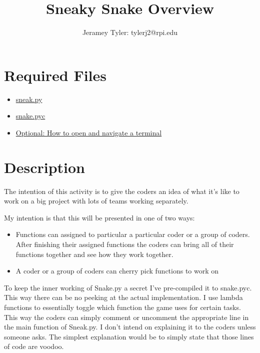 \documentclass{article}
\begin{document}
\title{Sneaky Snake Overview}
\author{Jeramey Tyler: tylerj2@rpi.edu}
\maketitle

\section{Required Files}

\begin{itemize}
\item{\href{https://raw.githubusercontent.com/JerameyATyler/coderDojo/master/sneak.py}{sneak.py}}
\item{\href{https://github.com/JerameyATyler/coderDojo/raw/master/__pycache__/snake.pyc}{snake.pyc}}
\item{\href{}{Optional: How to open and navigate a terminal}}
\end{itemize}

\section{Description}
The intention of this activity is to give the coders an idea of what it's like to work on a big project with lots of teams working separately. 

My intention is that this will be presented in one of two ways:
\begin{itemize}
\item{Functions can assigned to particular a particular coder or a group of coders. After finishing their assigned functions the coders can bring all of their functions together and see how they work together.}
\item{A coder or a group of coders can cherry pick functions to work on}
\end{itemize}

To keep the inner working of Snake.py a secret I've pre-compiled it to snake.pyc. This way there can be no peeking at the actual implementation. I use lambda functions to essentially toggle which function the game uses for certain tasks. This way the coders can simply comment or uncomment the appropriate line in the main function of Sneak.py. I don't intend on explaining it to the coders unless someone asks. The simplest explanation would be to simply state that those lines of code are voodoo. 
\end{document}
